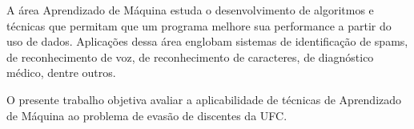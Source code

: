 A área Aprendizado de Máquina estuda o desenvolvimento de algoritmos e técnicas que permitam que um programa melhore sua performance a partir do uso de dados. Aplicações dessa área englobam sistemas de identificação de spams, de reconhecimento de voz, de reconhecimento de caracteres, de diagnóstico médico, dentre outros. 

 




O presente trabalho objetiva avaliar a aplicabilidade de técnicas de Aprendizado de Máquina ao problema de evasão de discentes da UFC.